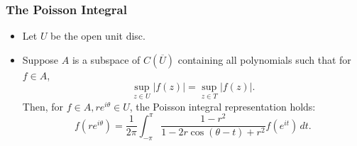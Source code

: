 \documentclass{article}
\newcounter{topicnumber}[section]
\newcommand{\steptopic}[1][1]{\addtocounter{topicnumber}{#1}}
\newenvironment{topic}[1]{%
\steptopic%
\subsubsection{#1}%
\begin{itemize}%
}{%
\end{itemize}%
}
\newcommand{\setup}{\item[\null]}
\newcommand{\remark}{\item}
\begin{document}
\begin{topic}{The Poisson Integral}
\setup Let $U$ be the open unit disc.
\remark Suppose $A$ is a subspace of $C(\overline{U})$ containing all polynomials such that for $f \in A$, $$\sup_{z \in U} |f(z)| = \sup_{z \in T} |f(z)|.$$ Then, for $f \in A, re^{i\theta} \in U$, the Poisson integral representation holds: $$f(re^{i\theta}) = \dfrac{1}{2\pi} \int_{-\pi}^\pi \dfrac{1 - r^2}{1 - 2r \cos (\theta - t) + r^2} f(e^{it})\,dt.$$
\end{topic}

\newpage
\printindex
\end{document}
